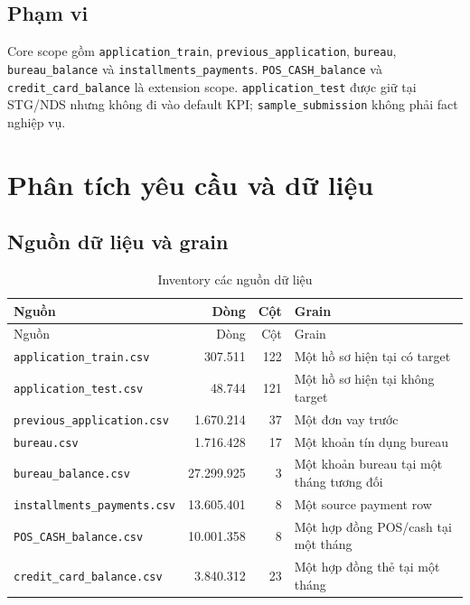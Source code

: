 \documentclass[12pt,a4paper,oneside]{report}
\begin{document}
\section{Phạm vi}
Core scope gồm \texttt{application\_train}, \texttt{previous\_application}, \texttt{bureau}, \texttt{bureau\_balance} và \texttt{installments\_payments}. \texttt{POS\_CASH\_balance} và \texttt{credit\_card\_balance} là extension scope. \texttt{application\_test} được giữ tại STG/NDS nhưng không đi vào default KPI; \texttt{sample\_submission} không phải fact nghiệp vụ.

\chapter{Phân tích yêu cầu và dữ liệu}
\section{Nguồn dữ liệu và grain}
\begin{longtable}{p{4.2cm}rrp{5.5cm}}
\caption{Inventory các nguồn dữ liệu}\label{tab:sources}\\
\toprule
Nguồn & Dòng & Cột & Grain \\
\midrule
\endfirsthead
\toprule Nguồn & Dòng & Cột & Grain \\
\midrule
\endhead
\texttt{application\_train.csv} & 307.511 & 122 & Một hồ sơ hiện tại có target \\
\texttt{application\_test.csv} & 48.744 & 121 & Một hồ sơ hiện tại không target \\
\texttt{previous\_application.csv} & 1.670.214 & 37 & Một đơn vay trước \\
\texttt{bureau.csv} & 1.716.428 & 17 & Một khoản tín dụng bureau \\
\texttt{bureau\_balance.csv} & 27.299.925 & 3 & Một khoản bureau tại một tháng tương đối \\
\texttt{installments\_payments.csv} & 13.605.401 & 8 & Một source payment row \\
\texttt{POS\_CASH\_balance.csv} & 10.001.358 & 8 & Một hợp đồng POS/cash tại một tháng \\
\texttt{credit\_card\_balance.csv} & 3.840.312 & 23 & Một hợp đồng thẻ tại một tháng \\
\bottomrule
\end{longtable}
\end{document}
